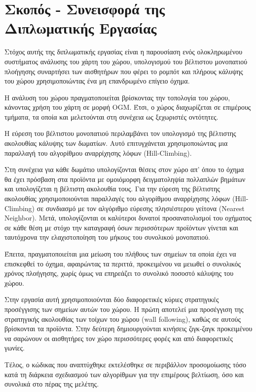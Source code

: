 \section{Σκοπός - Συνεισφορά της Διπλωματικής Εργασίας}
\label{section:contribution}

Στόχος αυτής της διπλωματικής εργασίας είναι η παρουσίαση ενός ολοκληρωμένου συστήματος ανάλυσης του χάρτη του χώρου, υπολογισμού του βέλτιστου μονοπατιού πλοήγησης συναρτήσει των αισθητήρων που φέρει το ρομπότ και πλήρους κάλυψης του χώρου χρησιμοποιώντας ένα μη επανδρωμένο επίγειο όχημα. 

Η ανάλυση του χώρου πραγματοποιείται βρίσκοντας την τοπολογία του χώρου, κάνοντας χρήση του χάρτη σε μορφή OGM. Έτσι, ο χώρος διαχωρίζεται σε επιμέρους τμήματα, τα οποία και μελετούνται στη συνέχεια ως ξεχωριστές οντότητες.

Η εύρεση του βέλτιστου μονοπατιού περιλαμβάνει τον υπολογισμό της βέλτιστης ακολουθίας κάλυψης των δωματίων. Αυτό επιτυγχάνεται χρησιμοποιώντας μια παραλλαγή του αλγορίθμου αναρρίχησης λόφων (Hill-Climbing). 

Στη συνέχεια για κάθε δωμάτιο υπολογίζονται θέσεις στον χώρο απ' όπου το όχημα θα έχει πρόσβαση στα προϊόντα με ομοιόμορφη δειγματοληψία πολλαπλών βημάτων και υπολογίζεται η βέλτιστη ακολουθία τους. Για την εύρεση της βέλτιστης ακολουθίας χρησιμοποιούνται παραλλαγές του αλγορίθμου αναρρίχησης λόφων (Hill-Climbing) σε συνδιασμό με τον αλγόριθμο εύρεσης πλησιέστερου γείτονα (Nearest Neighbor). Μετά, υπολογίζονται οι καλύτεροι δυνατοί προσανατολισμοί του οχήματος σε κάθε θέση με στόχο την καταγραφή όσων περισσότερων προϊόντων γίνεται και ταυτόχρονα την ελαχιστοποίηση του μήκους του συνολικού μονοπατιού.
 
Έπειτα, πραγματοποιείται μια μείωση του πλήθους των σημείων τα οποία έχει να επισκεφθεί το όχημα, αφαιρώντας τα περιττά, προκειμένου να μειωθεί ο συνολικός χρόνος πλοήγησης, χωρίς όμως να επηρεάζει το συνολικό ποσοστό κάλυψης του χώρου.
 
Στην εργασία αυτή χρησιμοποιούνται δύο διαφορετικές κύριες στρατηγικές προσέγγισης των σημείων αυτών του χώρου. Η πρώτη αποτελεί μια προσέγγιση της στρατηγικής ακολουθίας των τοίχων του χώρου (wall following), καθώς σε αυτούς βρίσκονται τα προϊόντα. Στην δεύτερη δημιουργούνται κινήσεις ζιγκ-ζαγκ προκειμένου να σαρώνουν οι αισθητήρες τον χώρο περισσότερες φορές και από διαφορετικές γωνίες.
 
Τέλος, ο κώδικας που αναπτύχθηκε εκτελέσθηκε σε περιβάλλον προσομοίωσης τόσο κατά τη διάρκεια σχεδιασμού των αλγορίθμων για την επιμέρους βελτίωση, όσο και συνολικά στο πέρας της μελέτης.